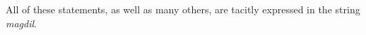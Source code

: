 All of these statements, as well as many others,
are tacitly expressed in the string \textit{magdil}.

